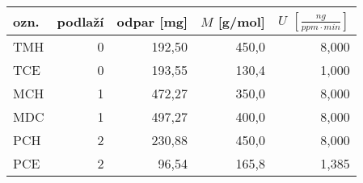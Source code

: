 \begin{tabular}{lrrrr}
\toprule
ozn. & podlaží& odpar [mg] &    $M$ [g/mol] &    $U$ $\left[\si{\frac{ng}{ppm\cdot min}}\right]$\\
\midrule
TMH & 0 &192,50 &  450,0 &  8,000 \\
TCE & 0 &193,55 &  130,4 &  1,000 \\
MCH & 1 &472,27 &  350,0 &  8,000 \\
MDC & 1 &497,27 &  400,0 &  8,000 \\
PCH & 2 &230,88 &  450,0 &  8,000 \\
PCE & 2 & 96,54 &  165,8 &  1,385 \\
\bottomrule
\end{tabular}
